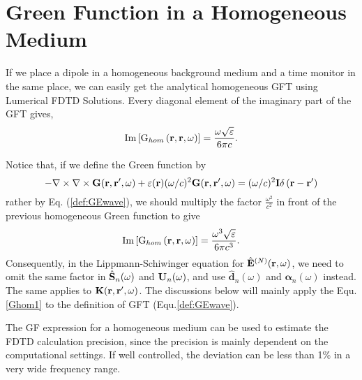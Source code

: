 \chapter[Homogeneous GF]{Green Function in a Homogeneous Medium}\label{App:homogeneous}
If we place a dipole in a homogeneous background medium and a time monitor in the same place, we can easily get the analytical homogeneous GFT using Lumerical FDTD Solutions.
Every diagonal element of the imaginary part of the GFT gives,
\begin{equation}
 \label{Ghom1}
{\rm Im}\left[ {\rm G}_{hom} \left(\mathbf{r},\mathbf{r},\omega\right)\right] = \frac{\omega \sqrt{\varepsilon}}{6\pi c}.
\end{equation}

Notice that, if we define the Green function by
\begin{equation}
\label{def:GEwave2}
 -\nabla \times \nabla \times \mathbf{G}(\mathbf{r},\mathbf{r}',\omega) + \varepsilon(\mathbf{r})(\omega/c)^2 \mathbf{G}(\mathbf{r},\mathbf{r}',\omega) = (\omega/c)^2\mathbf{I} \delta \left(\mathbf{r}-\mathbf{r}'\right)
\end{equation}
rather by Eq. (\ref{def:GEwave}), we should multiply the factor $\frac{\omega^2}{c^2}$ in front of the previous homogeneous Green function to give
\begin{equation}
 \label{Ghom2}
{\rm Im}\left[ {\rm G}_{hom} \left(\mathbf{r},\mathbf{r},\omega\right)\right] = \frac{\omega^3 \sqrt{\varepsilon}}{6\pi c^3}.
\end{equation}
Consequently, in the Lippmann-Schiwinger equation for $\hat{\mathbf{E}}^{(N)}(\mathbf{r},\omega)$, we need to omit the same factor in $\hat{\mathbf{S}}_n(\omega)$ and $\mathbf{U}_n(\omega)$, and use $\hat{\mathbf{d}}_n(\omega)$ and ${\bm \alpha}_n(\omega)$ instead. The same applies to $\mathbf{K}(\mathbf{r},\mathbf{r}',\omega)$.
The discussions below will mainly apply the Equ.\eqref{Ghom1} to the definition of GFT (Equ.\eqref{def:GEwave}).



The GF expression for a homogeneous medium can be used to estimate the FDTD calculation precision, since the precision is mainly dependent on the computational settings.
If well controlled, the deviation can be less than 1\% in a very wide frequency range.

